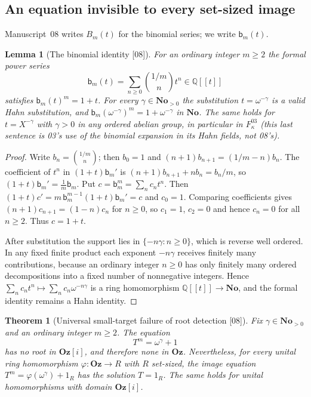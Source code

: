 \documentclass[11pt,letterpaper]{article}
\numberwithin{equation}{section}
\newtheorem{theorem}{Theorem}[section]
\newtheorem{lemma}[lemma]{Lemma}
\theoremstyle{definition}
\theoremstyle{remark}
\theoremstyle{plain}
\newcommand{\No}{\mathbf{No}}
\newcommand{\Oz}{\mathbf{Oz}}
\newcommand{\GOz}{\Oz[i]}
\newcommand{\Q}{\mathbb Q}
\newcommand{\src}[1]{\textup{\textsf{[#1]}}}
\begin{document}
\subsection{An equation invisible to every set-sized image}\label{osq:nm:sub:invisible}

Manuscript~08 writes $B_m(t)$ for the binomial series; we write $\mathsf b_m(t)$.

\begin{lemma}[The binomial identity \src{08}]\label{osq:nm:lem:binomial}
For an ordinary integer $m\ge2$ the formal power series
\[
 \mathsf b_m(t)=\sum_{n\ge0}\binom{1/m}{n}t^n\in\Q[[t]]
\]
satisfies $\mathsf b_m(t)^m=1+t$. For every $\gamma\in\No_{>0}$ the substitution
$t=\omega^{-\gamma}$ is a valid Hahn substitution, and
$\mathsf b_m(\omega^{-\gamma})^m=1+\omega^{-\gamma}$ in $\No$. The same holds for
$t=X^{-\gamma}$ with $\gamma>0$ in any ordered abelian group, in particular in
$F^{03}_\kappa$ (this last sentence is 03's use of the binomial expansion in its Hahn fields, not 08's).
\end{lemma}

\begin{proof}
Write $b_n=\binom{1/m}{n}$; then $b_0=1$ and $(n+1)b_{n+1}=(1/m-n)b_n$. The coefficient of
$t^n$ in $(1+t)\mathsf b_m'$ is $(n+1)b_{n+1}+nb_n=b_n/m$, so
$(1+t)\mathsf b_m'=\frac1m\mathsf b_m$. Put $c=\mathsf b_m^m=\sum_nc_nt^n$. Then
$(1+t)c'=m\,\mathsf b_m^{m-1}(1+t)\mathsf b_m'=c$ and $c_0=1$. Comparing coefficients gives
$(n+1)c_{n+1}=(1-n)c_n$ for $n\ge0$, so $c_1=1$, $c_2=0$ and hence $c_n=0$ for all $n\ge2$.
Thus $c=1+t$.

After substitution the support lies in $\{-n\gamma:n\ge0\}$, which is reverse well
ordered. In any fixed finite product each exponent $-n\gamma$ receives finitely many
contributions, because an ordinary integer $n\ge0$ has only finitely many ordered
decompositions into a fixed number of nonnegative integers. Hence
$\sum_nc_nt^n\mapsto\sum_nc_n\omega^{-n\gamma}$ is a ring homomorphism
$\Q[[t]]\to\No$, and the formal identity remains a Hahn identity.
\end{proof}

\begin{theorem}[Universal small-target failure of root detection \src{08}]\label{osq:nm:thm:invisible}
Fix $\gamma\in\No_{>0}$ and an ordinary integer $m\ge2$. The equation
\begin{equation}\label{osq:nm:eq:invisible}
 T^m=\omega^\gamma+1
\end{equation}
has no root in $\GOz$, and therefore none in $\Oz$. Nevertheless, for every unital ring
homomorphism $\varphi:\Oz\to R$ with $R$ set-sized, the image equation
$T^m=\varphi(\omega^\gamma)+1_R$ has the solution $T=1_R$. The same holds for unital
homomorphisms with domain $\GOz$.
\end{theorem}
\end{document}
